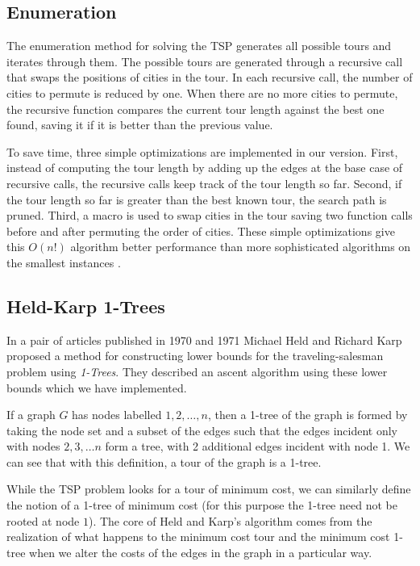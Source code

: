 \documentclass[11pt]{article}
\begin{document}
	\subsection{Enumeration}
	The enumeration method for solving the TSP generates all possible tours and iterates through them. The possible tours are generated through a recursive call that swaps the positions of cities in the tour. In each recursive call, the number of cities to permute is reduced by one. When there are no more cities to permute, the recursive function compares the current tour length against the best one found, saving it if it is better than the previous value. 
	
	To save time, three simple optimizations are implemented in our version. First, instead of computing the tour length by adding up the edges at the base case of recursive calls, the recursive calls keep track of the tour length so far. Second, if the tour length so far is greater than the best known tour, the search path is pruned. Third, a macro is used to swap cities in the tour saving two function calls before and after permuting the order of cities. These simple optimizations give this $O(n!)$ algorithm better performance than more sophisticated algorithms on the smallest instances \cite{bico-1}.
	
	\subsection{Held-Karp 1-Trees}
	
	In a pair of articles published in 1970 and 1971 \cite{OneTree70,OneTree71} Michael Held and Richard Karp proposed a method for constructing lower bounds for the traveling-salesman problem using \emph{1-Trees}. They described an ascent algorithm using these lower bounds which we have implemented.
	
	If a graph $G$ has nodes labelled $1, 2, \dots, n$, then a 1-tree of the graph is formed by taking the node set and a subset of the edges such that the edges incident only with nodes $2, 3, \dots n$ form a tree, with 2 additional edges incident with node 1. We can see that with this definition, a tour of the graph is a 1-tree.
	
	While the TSP problem looks for a tour of minimum cost, we can similarly define the notion of a 1-tree of minimum cost (for this purpose the 1-tree need not be rooted at node $1$). The core of Held and Karp's algorithm comes from the realization of what happens to the minimum cost tour and the minimum cost 1-tree when we alter the costs of the edges in the graph in a particular way.
	
\end{document}
